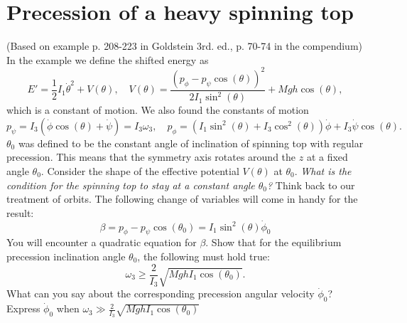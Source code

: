 \documentclass{article}
\begin{document}
    \section{Precession of a heavy spinning top}
        (Based on example p. 208-223 in Goldstein 3rd. ed., p. 70-74 in the compendium)\\
        In the example we define the shifted energy as 
        \begin{equation*}
            E' = \frac{1}{2}I_1 \dot \theta^2 + V(\theta), \quad V(\theta) = \frac{(p_\phi - p_\psi \cos(\theta))^2}{2I_1\sin^2(\theta)} + Mgh\cos(\theta),
        \end{equation*}
        which is a constant of motion. We also found the constants of motion 
        \begin{equation*}
            p_\psi =  I_3(\dot \phi \cos(\theta) + \dot \psi) = I_3 \omega_3, \quad
            p_\phi = (I_1 \sin^2(\theta) + I_3 \cos^2(\theta)) \dot \phi + I_3 \dot \psi \cos(\theta).
        \end{equation*}
        $\theta_0$ was defined to be the constant angle of inclination of spinning top with regular precession. This means that the symmetry axis rotates around the $z$ at a fixed angle $\theta_0$. Consider the shape of the effective potential $V(\theta)$ at $\theta_0$. \emph{What is the condition for the spinning top to stay at a constant angle $\theta_0$?} Think back to our treatment of orbits. The following change of variables will come in handy for the result:
        \begin{equation*}
            \beta = p_\phi - p_\psi \cos(\theta_0) = I_1 \sin^2(\theta) \dot \phi_0
        \end{equation*}
        You will encounter a quadratic equation for $\beta$. Show that for the equilibrium precession inclination angle $\theta_0$, the following must hold true:
        \begin{equation*}
            \omega_3 \ge \frac{2}{I_3}\sqrt{MghI_1 \cos(\theta_0) }.
        \end{equation*}
        What can you say about the corresponding precession angular velocity $\dot \phi_0$? Express $\dot \phi_0$ when $\omega_3 \gg \frac{2}{I_3}\sqrt{MghI_1 \cos(\theta_0) }$
\end{document}
